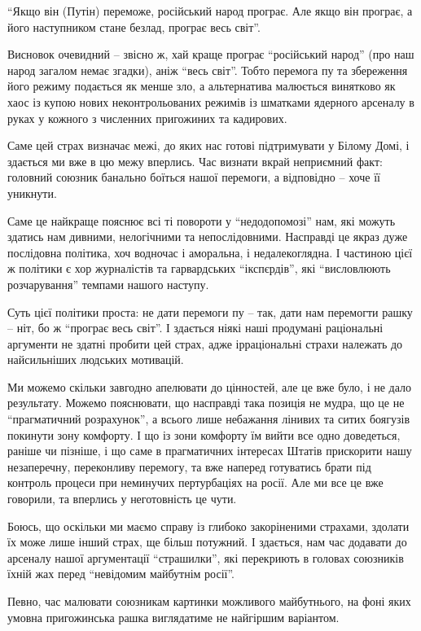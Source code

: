 \enquote{Якщо він (Путін) переможе, російський народ програє. Але якщо він програє, а
його наступником стане безлад, програє весь світ}.

Висновок очевидний – звісно ж, хай краще програє \enquote{російський народ} (про наш
народ загалом немає згадки), аніж \enquote{весь світ}. Тобто перемога пу та збереження
його режиму подається як менше зло, а альтернатива малюється винятково як хаос
із купою нових неконтрольованих режимів із шматками ядерного арсеналу в руках у
кожного з численних пригожиних та кадирових.

Саме цей страх визначає межі, до яких нас готові підтримувати у Білому Домі, і
здається ми вже в цю межу вперлись. Час визнати вкрай неприємний факт: головний
союзник банально боїться нашої перемоги, а відповідно – хоче її уникнути.

Саме це найкраще пояснює всі ті повороти у \enquote{недодопомозі} нам, які можуть
здатись нам дивними, нелогічними та непослідовними. Насправді це якраз дуже
послідовна політика, хоч водночас і аморальна, і недалекоглядна. І частиною
цієї ж політики є хор журналістів та гарвардських \enquote{ікспєрдів}, які \enquote{висловлюють
розчарування} темпами нашого наступу.

Суть цієї політики проста: не дати перемоги пу – так, дати нам перемогти рашку
– ніт, бо ж \enquote{програє весь світ}. І здається ніякі наші продумані раціональні
аргументи не здатні пробити цей страх, адже ірраціональні страхи належать до
найсильніших людських мотивацій.

Ми можемо скільки завгодно апелювати до цінностей, але це вже було, і не дало
результату. Можемо пояснювати, що насправді така позиція не мудра, що це не
\enquote{прагматичний розрахунок}, а всього лише небажання лінивих та ситих боягузів
покинути зону комфорту. І що із зони комфорту їм вийти все одно доведеться,
раніше чи пізніше, і що саме в прагматичних інтересах Штатів прискорити нашу
незаперечну, переконливу перемогу, та вже наперед готуватись брати під контроль
процеси при неминучих пертурбаціях на росії. Але ми все це вже говорили, та
вперлись у неготовність це чути.

Боюсь, що оскільки ми маємо справу із глибоко закоріненими страхами, здолати їх
може лише інший страх, ще більш потужний. І здається, нам час додавати до
арсеналу нашої аргументації \enquote{страшилки}, які перекриють в головах союзників
їхній жах перед \enquote{невідомим майбутнім росії}.

Певно, час малювати союзникам картинки можливого майбутнього, на фоні яких
умовна пригожинська рашка виглядатиме не найгіршим варіантом.

